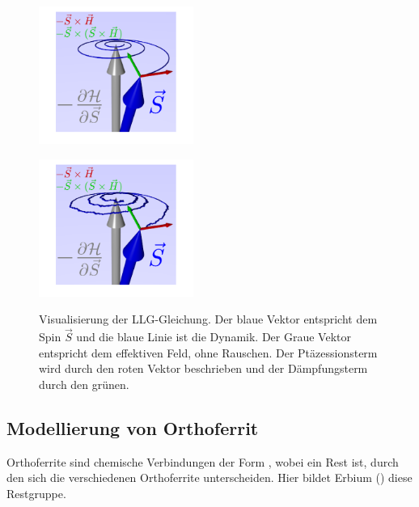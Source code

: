 \documentclass[main.tex]{subfiles}
\begin{document}
\begin{figure}[H]
	\centering

	{\includegraphics[width=0.45\textwidth]{bilder/jschlege/LLG_T0_labeled.png}}

	{\includegraphics[width=0.45\textwidth]{bilder/jschlege/LLG_labeled.png}}
	\caption{Visualisierung der LLG-Gleichung. Der blaue Vektor entspricht
		dem Spin \(\vec{S}\) und die blaue Linie ist die Dynamik. Der
		Graue Vektor
		entspricht dem effektiven Feld, ohne Rauschen. Der
		Ptäzessionsterm wird durch
		den roten Vektor beschrieben und der Dämpfungsterm durch den
		grünen.
		\cite{schlegel-master}}
	\label{fig:llg-rauschen}
\end{figure}

\subsection{Modellierung von Orthoferrit}

Orthoferrite sind chemische Verbindungen der Form , wobei  ein
Rest ist, durch den sich die verschiedenen Orthoferrite unterscheiden. Hier
bildet Erbium () diese Restgruppe. 

\end{document}
